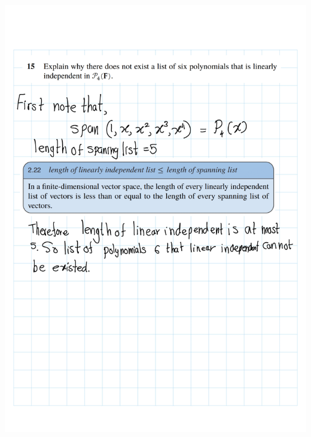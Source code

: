 \documentclass[
]{book}
\theoremstyle{definition}
\theoremstyle{definition}
\theoremstyle{definition}
\theoremstyle{definition}
\theoremstyle{remark}
\begin{document}
\includegraphics{fig/Ex2A/Ex2A-18.png}
\end{document}
